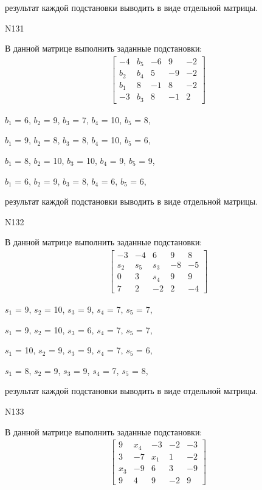 \documentclass[11pt]{report}
\begin{document}
результат каждой подстановки выводить в виде отдельной матрицы.

N131

В данной матрице выполнить заданные подстановки:
\begin{align*}
\left[\begin{matrix}-4 & b_{5} & -6 & 9 & -2\\b_{2} & b_{4} & 5 & -9 & -2\\b_{1} & 8 & -1 & 8 & -2\\-3 & b_{3} & 8 & -1 & 2\end{matrix}\right]
\end{align*}


$b_{1}$ = 6, $b_{2}$ = 9, $b_{3}$ = 7, $b_{4}$ = 10, $b_{5}$ = 8, 

$b_{1}$ = 9, $b_{2}$ = 8, $b_{3}$ = 8, $b_{4}$ = 10, $b_{5}$ = 6, 

$b_{1}$ = 8, $b_{2}$ = 10, $b_{3}$ = 10, $b_{4}$ = 9, $b_{5}$ = 9, 

$b_{1}$ = 6, $b_{2}$ = 9, $b_{3}$ = 8, $b_{4}$ = 6, $b_{5}$ = 6, 

результат каждой подстановки выводить в виде отдельной матрицы.

N132

В данной матрице выполнить заданные подстановки:
\begin{align*}
\left[\begin{matrix}-3 & -4 & 6 & 9 & 8\\s_{2} & s_{5} & s_{3} & -8 & -5\\0 & 3 & s_{4} & 9 & 9\\7 & 2 & -2 & 2 & -4\end{matrix}\right]
\end{align*}


$s_{1}$ = 9, $s_{2}$ = 10, $s_{3}$ = 9, $s_{4}$ = 7, $s_{5}$ = 7, 

$s_{1}$ = 9, $s_{2}$ = 10, $s_{3}$ = 6, $s_{4}$ = 7, $s_{5}$ = 7, 

$s_{1}$ = 10, $s_{2}$ = 9, $s_{3}$ = 9, $s_{4}$ = 7, $s_{5}$ = 6, 

$s_{1}$ = 8, $s_{2}$ = 9, $s_{3}$ = 9, $s_{4}$ = 7, $s_{5}$ = 8, 

результат каждой подстановки выводить в виде отдельной матрицы.

N133

В данной матрице выполнить заданные подстановки:
\begin{align*}
\left[\begin{matrix}9 & x_{4} & -3 & -2 & -3\\3 & -7 & x_{1} & 1 & -2\\x_{3} & -9 & 6 & 3 & -9\\9 & 4 & 9 & -2 & 9\end{matrix}\right]
\end{align*}
\end{document}
